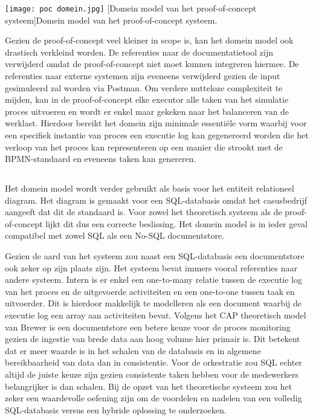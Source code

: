 \subsubsection{}%
\label{subsubsec:domein proof-of-concept systeem}
\begin{center}
  \captionsetup{type=figure}
  \texttt{[image: poc domein.jpg]}
  [Domein model van het proof-of-concept systeem]{Domein model van het proof-of-concept systeem.}
\end{center}
Gezien de proof-of-concept veel kleiner in scope is, kan het domein model ook drastisch verkleind worden. De referenties naar de documentatietool zijn verwijderd omdat de proof-of-concept niet moet kunnen integreren hiermee. De referenties naar externe systemen zijn eveneens verwijderd gezien de input gesimuleerd zal worden via Postman. Om verdere nutteloze complexiteit te mijden, kan in de proof-of-concept elke executor alle taken van het simulatie proces uitvoeren en wordt er enkel maar gekeken naar het balanceren van de werklast. Hierdoor bereikt het domein zijn minimale essentiële vorm waarbij voor een specifiek instantie van proces een executie log kan gegenereerd worden die het verloop van het proces kan representeren op een manier die strookt met de BPMN-standaard en eveneens taken kan genereren. 

\subsection{}%
\label{subsec:entiteit relationeel diagram}
Het domein model wordt verder gebruikt als basis voor het entiteit relationeel diagram. Het diagram is gemaakt voor een SQL-databasis omdat het casusbedrijf aangeeft dat dit de standaard is. Voor zowel het theoretisch systeem als de proof-of-concept lijkt dit dus een correcte beslissing. Het domein model is in ieder geval compatibel met zowel SQL als een No-SQL documentstore. \newline

Gezien de aard van het systeem zou naast een SQL-databasis een documentstore ook zeker op zijn plaats zijn. Het systeem bevat immers vooral referenties naar andere systeem. Intern is er enkel een one-to-many relatie tussen de executie log van het proces en de uitgevoerde activiteiten en een one-to-one tussen taak en uitvoerder. Dit is hierdoor makkelijk te modelleren als een document waarbij de executie log een array aan activiteiten bevat. Volgens het CAP theoretisch model van Brewer is een documentstore een betere keuze voor de proces monitoring gezien de ingestie van brede data aan hoog volume hier primair is. Dit betekent dat er meer waarde is in het schalen van de databasis en in algemene bereikbaarheid van data dan in consistentie. Voor de orkestratie zou SQL echter altijd de juiste keuze zijn gezien consistente taken hebben voor de medewerkers belangrijker is dan schalen.  Bij de opzet van het theoretische systeem zou het zeker een waardevolle oefening zijn om de voordelen en nadelen van een volledig SQL-databasis versus een hybride oplossing te onderzoeken.

